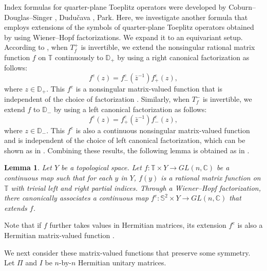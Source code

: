 \documentclass{amsart}
\theoremstyle{plain}
\newtheorem{lemma}[theorem]{Lemma}
\theoremstyle{definition}
\theoremstyle{remark}
\newcommand{\C}{\mathbb{C}}
\newcommand{\T}{\mathbb{T}}
\newcommand{\D}{\mathbb{D}}
\newcommand{\SSS}{\mathbb{S}}
\begin{document}
Index formulas for quarter-plane Toeplitz operators were developed by Coburn--Douglas--Singer \cite{CDS72}, Dudu\v cava \cite{Dud77b}, Park\cite{Pa90}.
Here, we investigate another formula \cite{Hayashi5} that employs extensions of the symbols of quarter-plane Toeplitz operators obtained by using Wiener--Hopf factorizations.
We expand it to an equivariant setup.
According to \cite{Hayashi5}, when $T^+_f$ is invertible, we extend the nonsingular rational matrix function $f$ on $\T$ continuously to $\D_+$ by using a right canonical factorization as follows:
\begin{equation*}
	f^e(z) = f^e_-(\bar{z}^{-1})f^e_+(z),
\end{equation*}
where $z \in \D_+$.
This $f^e$ is a nonsingular matrix-valued function that is independent of the choice of factorization \cite[Lemma~3.1]{Hayashi5}.
Similarly, when $T^-_f$ is invertible, we extend $f$ to $\D_-$ by using a left canonical factorization as follows:
\begin{equation*}
	f^e(z) = f^e_+(\bar{z}^{-1})f^e_-(z),
\end{equation*}
where $z \in \D_-$.
This $f^e$ is also a continuous nonsingular matrix-valued function and is independent of the choice of left canonical factorization, which can be shown as in \cite[Lemma~3.1]{Hayashi5}.
Combining these results, the following lemma is obtained as in \cite[Lemma~3.3]{Hayashi5}.

\begin{lemma}
\label{extension1}
Let $Y$ be a topological space.
Let $f \colon \T \times Y \to GL(n,\C)$ be a continuous map such that for each $y$ in $Y$, $f(y)$ is a rational matrix function on $\T$ with trivial left and right partial indices.
Through a Wiener--Hopf factorization, there canonically associates a continuous map $f^e \colon \SSS^2 \times Y \to GL(n,\C)$ that extends $f$.
\end{lemma}
Note that if $f$ further takes values in Hermitian matrices, its extension $f^e$ is also a Hermitian matrix-valued function \cite[Lemma~3.5]{Hayashi5}.

We next consider these matrix-valued functions that preserve some symmetry.
Let $\Pi$ and $I$ be $n$-by-$n$ Hermitian unitary matrices.
\end{document}
